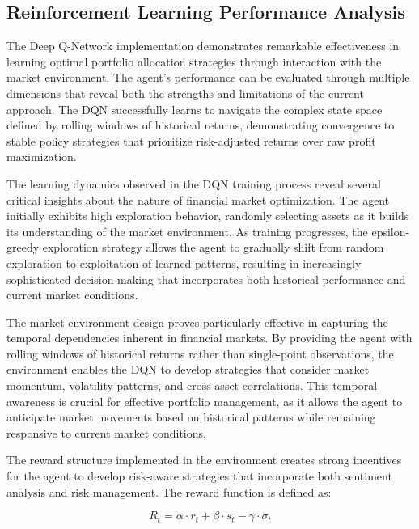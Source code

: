 \documentclass[12pt,a4paper]{article}
\begin{document}
\subsection{Reinforcement Learning Performance Analysis}

The Deep Q-Network implementation demonstrates remarkable effectiveness in learning optimal portfolio allocation strategies through interaction with the market environment. The agent's performance can be evaluated through multiple dimensions that reveal both the strengths and limitations of the current approach. The DQN successfully learns to navigate the complex state space defined by rolling windows of historical returns, demonstrating convergence to stable policy strategies that prioritize risk-adjusted returns over raw profit maximization.

The learning dynamics observed in the DQN training process reveal several critical insights about the nature of financial market optimization. The agent initially exhibits high exploration behavior, randomly selecting assets as it builds its understanding of the market environment. As training progresses, the epsilon-greedy exploration strategy allows the agent to gradually shift from random exploration to exploitation of learned patterns, resulting in increasingly sophisticated decision-making that incorporates both historical performance and current market conditions.

The market environment design proves particularly effective in capturing the temporal dependencies inherent in financial markets. By providing the agent with rolling windows of historical returns rather than single-point observations, the environment enables the DQN to develop strategies that consider market momentum, volatility patterns, and cross-asset correlations. This temporal awareness is crucial for effective portfolio management, as it allows the agent to anticipate market movements based on historical patterns while remaining responsive to current market conditions.

The reward structure implemented in the environment creates strong incentives for the agent to develop risk-aware strategies that incorporate both sentiment analysis and risk management. The reward function is defined as:

\begin{equation}
R_t = \alpha \cdot r_t + \beta \cdot s_t - \gamma \cdot \sigma_t
\end{equation}
\end{document}
